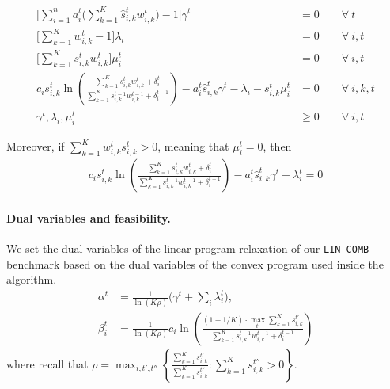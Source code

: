 \begin{align*}
   \biggl[ \sum_{i=1}^{n} a_{i}^{t} \biggl( \sum_{k=1}^{K}  \hat{s}_{i,k}^{t} w_{i,k}^{t} \biggr) - 1 \biggr] \gamma^{t} &= 0 \qquad \forall\ t \\
   \biggl[ \sum_{k=1}^{K}  w_{i,k}^{t}  - 1 \biggr] \lambda_{i} &= 0 \qquad \forall\ i, t \\
   \biggl[ \sum_{k=1}^{K}  s_{i,k}^{t} w_{i,k}^{t} \biggr] \mu_{i}^{t} &= 0 \qquad \forall\ i, t \\
%
 c_{i} s_{i,k}^{t} \ln \left( \frac{\sum_{k=1}^{K} s_{i,k}^{t} w_{i,k}^{t} + \delta_{i}^{t}}{\sum_{k=1}^{K}  s_{i,k}^{t-1}w_{i,k}^{t-1}  + \delta_{i}^{t-1}} \right)
    	- a_{i}^{t} \hat{s}_{i,k}^{t} \gamma^{t} - \lambda_{i} - s_{i,k}^{t} \mu_{i}^{t} &= 0	\qquad \forall\ i,k,t \\
	\gamma^{t}, \lambda_{i}, \mu_{i}^{t} &\geq 0 \qquad \forall\ i, t
\end{align*}

Moreover, if $\sum_{k=1}^{K} w_{i,k}^{t} s_{i,k}^{t} > 0$, meaning that $\mu_{i}^{t} = 0$, then
\begin{align}	\label{eq:KKT}
   c_{i} s_{i,k}^{t} \ln \left( \frac{\sum_{k=1}^{K} s_{i,k}^{t} w_{i,k}^{t}  + \delta_{i}^{t}}{\sum_{k=1}^{K}  s_{i,k}^{t-1}w_{i,k}^{t-1}  + \delta_{i}^{t-1}} \right)
    	- a_{i}^{t} \hat{s}_{i,k}^{t} \gamma^{t} - \lambda_{i}^{t} = 0
\end{align}


\paragraph{Dual variables and feasibility.} We set the dual variables of the linear program relaxation of our \texttt{LIN-COMB} benchmark based on the dual variables of the convex program used inside the algorithm.
%
\begin{align*}
    \alpha^{t} &= \frac{1}{\ln(K\rho)}  \biggl( \gamma^{t} + \sum_{i} \lambda_{i}^{t} \biggr), \\
    \beta_{i}^{t} &= \frac{1}{\ln(K\rho)} c_i \ln \left(\frac{ (1 + 1/K) \cdot \max_{t'} \sum_{k=1}^{K} s_{i,k}^{t'}}{\sum_{k=1}^{K}  s_{i,k}^{t-1} w_{i,k}^{t-1} + \delta_{i}^{t-1}}\right)
\end{align*}
%
where recall that $\rho = \max_{i, t',t''} \left\{\frac{\sum_{k=1}^{K} s_{i,k}^{t'}}{\sum_{k=1}^{K} s_{i,k}^{t''}} : \sum_{k=1}^{K} s_{i,k}^{t''} > 0 \right\}$.

